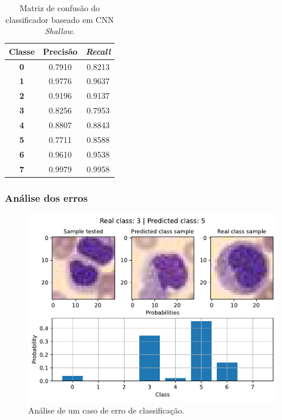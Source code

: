 \begin{table}[H]
	\centering
	\begin{tabular}{c|c|c}
		\textbf{Classe} & \textbf{Precisão} & \textit{\textbf{Recall}} \\ \hline
		\textbf{0}      & 0.7910            & 0.8213                   \\
		\textbf{1}      & 0.9776            & 0.9637                   \\
		\textbf{2}      & 0.9196            & 0.9137                   \\
		\textbf{3}      & 0.8256            & 0.7953                   \\
		\textbf{4}      & 0.8807            & 0.8843                   \\
		\textbf{5}      & 0.7711            & 0.8588                   \\
		\textbf{6}      & 0.9610            & 0.9538                   \\
		\textbf{7}      & 0.9979            & 0.9958                  
	\end{tabular}
	\caption{Matriz de confusão do classificador baseado em CNN \textit{Shallow}.}
	\label{tab:pr_CNN_shallow}
\end{table}

\subsubsection{Análise dos erros}

\begin{figure}[H]
\centering
\includegraphics[width=0.75\linewidth]{../../plot/cnn_shallow/error_analyser_1455}
\caption{Análise de um caso de erro de classificação.}
\label{fig:error_analyser_1455}
\end{figure}


